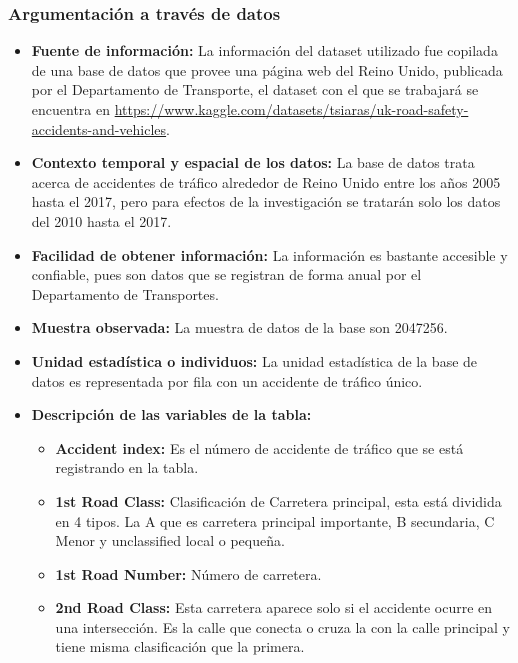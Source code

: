 \documentclass[12pt]{article}
\begin{document}
\subsubsection{Argumentación a través de datos}
\begin{itemize}
\item \textbf{Fuente de información:} La información del dataset utilizado fue copilada de una base de datos que provee una página web del Reino Unido, publicada por el Departamento de Transporte, el dataset con el que se trabajará se encuentra en \url{https://www.kaggle.com/datasets/tsiaras/uk-road-safety-accidents-and-vehicles}.

\item \textbf{Contexto temporal y espacial de los datos:}  La base de datos trata acerca de accidentes de tráfico alrededor de Reino Unido entre los años 2005 hasta el 2017, pero para efectos de la investigación se tratarán solo los datos del 2010 hasta el 2017.

\item \textbf{Facilidad de obtener información:} La información es bastante accesible y confiable, pues son datos que se registran de forma anual por el Departamento de Transportes. 

\item \textbf{Muestra observada:} La muestra de datos de la base son 2047256. 

\item \textbf{Unidad estadística o individuos:} La unidad estadística de la base de datos es representada por fila con un accidente de tráfico único.

\item \textbf{Descripción de las variables de la tabla:} 

\begin{itemize}
\item \textbf{Accident index:} Es el número de accidente de tráfico que se está registrando en la tabla.

\item \textbf{1st Road Class:} Clasificación de Carretera principal, esta está dividida en 4 tipos. La A que es carretera principal importante, B secundaria, C Menor y unclassified local o pequeña.

\item \textbf{1st Road Number:} Número de carretera.

\item \textbf{2nd Road Class:} Esta carretera aparece solo si el accidente ocurre en una intersección. Es la calle que conecta o cruza la con la calle principal y tiene misma clasificación que la primera. 


\end{itemize}
\end{itemize}
\end{document}
